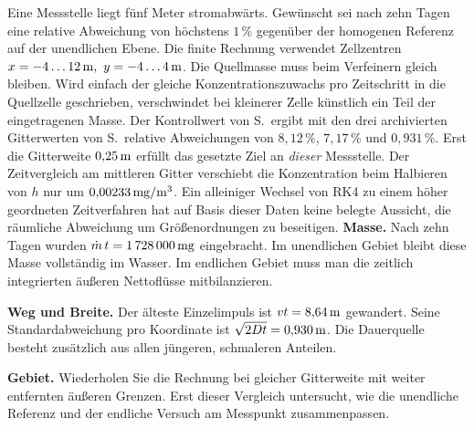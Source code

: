 Eine Messstelle liegt fünf Meter stromabwärts. Gewünscht sei nach zehn Tagen eine relative Abweichung von höchstens \(1\,\%\) gegenüber der homogenen Referenz auf der unendlichen Ebene. Die finite Rechnung verwendet Zellzentren \(x=-4\ldots12\,\mathrm{m},\ y=-4\ldots4\,\mathrm{m}\). Die Quellmasse muss beim Verfeinern gleich bleiben. Wird einfach der gleiche Konzentrationszuwachs pro Zeitschritt in die Quellzelle geschrieben, verschwindet bei kleinerer Zelle künstlich ein Teil der eingetragenen Masse.
Der Kontrollwert von S.\, ergibt mit den drei archivierten Gitterwerten von S.\, relative Abweichungen von \(8{,}12\,\%\), \(7{,}17\,\%\) und \(0{,}931\,\%\). Erst die Gitterweite \(0{,}25\,\mathrm{m}\) erfüllt das gesetzte Ziel an \emph{dieser} Messstelle. Der Zeitvergleich am mittleren Gitter verschiebt die Konzentration beim Halbieren von \(h\) nur um \(0{,}00233\,\mathrm{mg/m^3}\). Ein alleiniger Wechsel von RK4 zu einem höher geordneten Zeitverfahren hat auf Basis dieser Daten keine belegte Aussicht, die räumliche Abweichung um Größenordnungen zu beseitigen.
\textbf{Masse.} Nach zehn Tagen wurden \(\dot m\,t=1\,728\,000\,\mathrm{mg}\) eingebracht. Im unendlichen Gebiet bleibt diese Masse vollständig im Wasser. Im endlichen Gebiet muss man die zeitlich integrierten äußeren Nettoflüsse mitbilanzieren.

\textbf{Weg und Breite.} Der älteste Einzelimpuls ist \(vt=8{,}64\,\mathrm{m}\) gewandert. Seine Standardabweichung pro Koordinate ist \(\sqrt{2Dt}=0{,}930\,\mathrm{m}\). Die Dauerquelle besteht zusätzlich aus allen jüngeren, schmaleren Anteilen.

\textbf{Gebiet.} Wiederholen Sie die Rechnung bei gleicher Gitterweite mit weiter entfernten äußeren Grenzen. Erst dieser Vergleich untersucht, wie die unendliche Referenz und der endliche Versuch am Messpunkt zusammenpassen.

